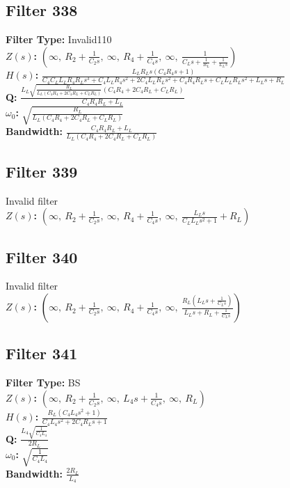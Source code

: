 \documentclass{article}
\begin{document}
\subsection*{Filter 338}
\textbf{Filter Type:} Invalid110 \\ 
\textbf{$Z(s)$:} $\left( \infty, \  R_{2} + \frac{1}{C_{2} s}, \  \infty, \  R_{4} + \frac{1}{C_{4} s}, \  \infty, \  \frac{1}{C_{L} s + \frac{1}{R_{L}} + \frac{1}{L_{L} s}}\right)$ \\ 
\textbf{$H(s)$:} $\frac{L_{L} R_{L} s \left(C_{4} R_{4} s + 1\right)}{C_{4} C_{L} L_{L} R_{4} R_{L} s^{3} + C_{4} L_{L} R_{4} s^{2} + 2 C_{4} L_{L} R_{L} s^{2} + C_{4} R_{4} R_{L} s + C_{L} L_{L} R_{L} s^{2} + L_{L} s + R_{L}}$ \\ 
\textbf{Q:} $\frac{L_{L} \sqrt{\frac{R_{L}}{L_{L} \left(C_{4} R_{4} + 2 C_{4} R_{L} + C_{L} R_{L}\right)}} \left(C_{4} R_{4} + 2 C_{4} R_{L} + C_{L} R_{L}\right)}{C_{4} R_{4} R_{L} + L_{L}}$ \\ 
\textbf{$\omega_0$:} $\sqrt{\frac{R_{L}}{L_{L} \left(C_{4} R_{4} + 2 C_{4} R_{L} + C_{L} R_{L}\right)}}$ \\ 
\textbf{Bandwidth:} $\frac{C_{4} R_{4} R_{L} + L_{L}}{L_{L} \left(C_{4} R_{4} + 2 C_{4} R_{L} + C_{L} R_{L}\right)}$ \\ 
\subsection*{Filter 339}
Invalid filter \\ 
\textbf{$Z(s)$:} $\left( \infty, \  R_{2} + \frac{1}{C_{2} s}, \  \infty, \  R_{4} + \frac{1}{C_{4} s}, \  \infty, \  \frac{L_{L} s}{C_{L} L_{L} s^{2} + 1} + R_{L}\right)$ \\ 
\subsection*{Filter 340}
Invalid filter \\ 
\textbf{$Z(s)$:} $\left( \infty, \  R_{2} + \frac{1}{C_{2} s}, \  \infty, \  R_{4} + \frac{1}{C_{4} s}, \  \infty, \  \frac{R_{L} \left(L_{L} s + \frac{1}{C_{L} s}\right)}{L_{L} s + R_{L} + \frac{1}{C_{L} s}}\right)$ \\ 
\subsection*{Filter 341}
\textbf{Filter Type:} BS \\ 
\textbf{$Z(s)$:} $\left( \infty, \  R_{2} + \frac{1}{C_{2} s}, \  \infty, \  L_{4} s + \frac{1}{C_{4} s}, \  \infty, \  R_{L}\right)$ \\ 
\textbf{$H(s)$:} $\frac{R_{L} \left(C_{4} L_{4} s^{2} + 1\right)}{C_{4} L_{4} s^{2} + 2 C_{4} R_{L} s + 1}$ \\ 
\textbf{Q:} $\frac{L_{4} \sqrt{\frac{1}{C_{4} L_{4}}}}{2 R_{L}}$ \\ 
\textbf{$\omega_0$:} $\sqrt{\frac{1}{C_{4} L_{4}}}$ \\ 
\textbf{Bandwidth:} $\frac{2 R_{L}}{L_{4}}$ \\ 
\end{document}
